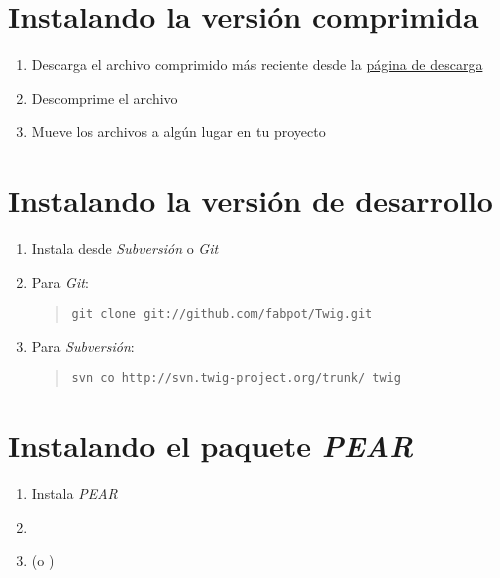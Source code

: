 \documentclass[letterpaper,10pt,spanish]{sphinxmanual}
\begin{document}
\section{Instalando la versión comprimida}
\label{intro:instalando-la-version-comprimida}\begin{enumerate}
\item {} 
Descarga el archivo comprimido más reciente desde la \href{https://github.com/fabpot/Twig/tags}{página de descarga}

\item {} 
Descomprime el archivo

\item {} 
Mueve los archivos a algún lugar en tu proyecto

\end{enumerate}


\section{Instalando la versión de desarrollo}
\label{intro:instalando-la-version-de-desarrollo}\begin{enumerate}
\item {} 
Instala desde \emph{Subversión} o \emph{Git}

\item {} 
Para \emph{Git}:
\begin{quote}

\begin{Verbatim}[commandchars=\\\{\}]
git clone git://github.com/fabpot/Twig.git
\end{Verbatim}
\end{quote}

\item {} 
Para \emph{Subversión}:
\begin{quote}

\begin{Verbatim}[commandchars=\\\{\}]
svn co http://svn.twig-project.org/trunk/ twig
\end{Verbatim}
\end{quote}

\end{enumerate}


\section{Instalando el paquete \emph{PEAR}}
\label{intro:instalando-el-paquete-pear}\begin{enumerate}
\item {} 
Instala \emph{PEAR}

\item {} 

\item {} 
 (o )

\end{enumerate}
\end{document}
